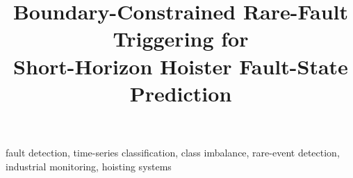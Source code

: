 \documentclass[conference]{IEEEtran}
\title{Boundary-Constrained Rare-Fault Triggering for\\Short-Horizon Hoister Fault-State Prediction}
\author{
  \IEEEauthorblockN{Anonymous Authors}
  \IEEEauthorblockA{Anonymous Institution}
}
\theoremstyle{definition}
\begin{document}
\maketitle

\begin{abstract}

\end{abstract}

\begin{IEEEkeywords}
fault detection, time-series classification, class imbalance, rare-event detection, industrial monitoring, hoisting systems
\end{IEEEkeywords}










\appendix

\end{document}
